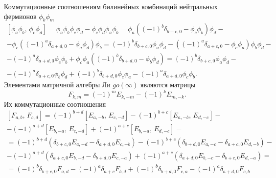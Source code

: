 \documentclass[a4paper,14pt]{extarticle}
\numberwithin{equation}{section}
\begin{document}
Коммутационные соотношениям
билинейных комбинаций нейтральных фермионов $\phi_k \phi_m$
\begin{multline}
\left[ \phi_{a}\phi_b,\,\phi_{c}\phi_d \right] =
\phi_a \phi_b \phi_c \phi_d -\phi_c \phi_d \phi_a \phi_b=
\phi_a \left( \left( -1 \right) ^b \delta_{b+c,0}-\phi_c \phi_b
 \right) 	\phi_d-\\-
 \phi_c \left( \left( -1 \right) ^a \delta_{a+d,0}-\phi_a \phi_d \right) \phi_b=
\left( -1 \right) ^b \delta_{b+c,0} \phi_a \phi_d-
(\left( -1 \right)^a \delta_{a+c,0}- \phi_c \phi_a) \phi_b \phi_d-\\-\left( -1 \right) ^a
\delta_{a+d,0} \phi_c \phi_b+\phi_c \phi_a \left(\left( -1 \right) ^b \delta_{b+d,0}-\phi_b \phi_d
\right) =\left( -1 \right) ^b \delta_{b+c,0} \phi_a \phi_d-\\-
\left( -1 \right)^a \delta_{a+c,0} \phi_b \phi_d+ \left( -1 \right) ^b \delta_{b+d,0} \phi_c \phi_a-\left( -1 \right) ^a
\delta_{a+d,0} \phi_c \phi_b
.\end{multline} 
Элементами матричной алгебры Ли $go(\infty)$
являются матрицы
\begin{equation}
	F_{k,m}=(-1)^m E_{k,-m}-(-1)^k E_{m,-k}
.\end{equation} 
Их коммутационные соотношения
\begin{multline}
	\left[ F_{a,b},\,F_{c,d} \right] =(-1)^{b+d}\left[ E_{a,-b},\, E_{c,-d} \right] -(-1)^{b+c} \left[ 
	E_{a,-b},\,E_{d,-c}\right] -\\-\left( -1 \right) ^{
a+d}\left[ E_{b,-a},\,E_{c,-d} \right] +
\left( -1 \right) ^{a+c}\left[ E_{b,-a},\,E_{d,-c} \right] =
\\=(-1)^{b+d}\left( \delta_{b+c,0} E_{a,-d}-
\delta_{a+d,0} E_{c,-b}\right) -
\left( -1 \right) ^{b+c}\left( \delta_{b+d,0}E_{a,-c}-
\delta_{a+c,0}E_{d,-b}\right)-\\-
\left( -1 \right) ^{a+d} \left( \delta_{a+c,0} E_{b,-d}
-\delta_{b+d,0}E_{c,-a}\right) +\left( -1 \right) ^{a+c}
\left( \delta_{a+d,0} E_{b,-c} -\delta_{b+c,0} E_{d,-a} \right) =\\=
(-1)^b \delta_{b+c,0} F_{a,d}-(-1)^a \delta_{a+c}F_{b,d}+
\left( -1 \right) ^b\delta_{b+d,0} F_{c,a}-\left( -1 \right) ^a \delta_{a+d,0} F_{c,b}
\end{multline} 
\end{document}
